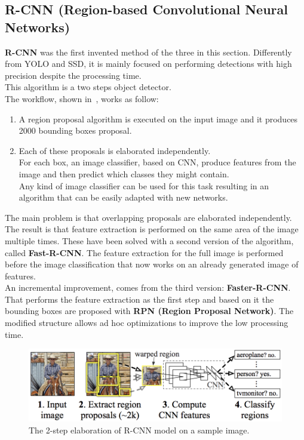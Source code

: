 \subsection{R-CNN (Region-based Convolutional Neural Networks)} \label{sec:r-cnn}
\textbf{R-CNN}\cite{r-cnn} was the first invented method of the three in this section. Differently from YOLO and SSD, it is mainly focused on performing detections with high precision despite the processing time.\\
This algorithm is a two steps object detector.\\
The workflow, shown in~, works as follow:
\begin{enumerate}
	\item A region proposal algorithm is executed on the input image and it produces 2000 bounding boxes proposal.
	\item Each of these proposals is elaborated independently. \\
	For each box, an image classifier, based on CNN, produce features from the image and then predict which classes they might contain.\\
	Any kind of image classifier can be used for this task resulting in an algorithm that can be easily adapted with new networks.
\end{enumerate}
The main problem is that overlapping proposals are elaborated independently. The result is that feature extraction is performed on the same area of the image multiple times. These have been solved with a second version of the algorithm, called \textbf{Fast-R-CNN}\cite{fast-r-cnn}. The feature extraction for the full image is performed before the image classification that now works on an already generated image of features.\\
An incremental improvement, comes from the third version: \textbf{Faster-R-CNN}\cite{faster-r-cnn}. That performs the feature extraction as the first step and based on it the bounding boxes are proposed with \textbf{RPN (Region Proposal Network)}. The modified structure allows ad hoc optimizations to improve the low processing time.

\begin{figure}[!h]
	\centering
	\includegraphics[width=0.8\linewidth]{images/detection/howItWorks_rcnn}
	\caption{The 2-step elaboration of R-CNN model on a sample image.}
	\label{fig:howItWorks_rcnn}
\end{figure}



